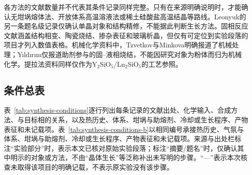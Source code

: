 各方法的文献数量并不代表其条件记录同样完整。只有在来源明确说明时，才能确认无坩埚熔体法、开放体系高温溶液法或稀土硅酸盐高温结晶等路线\cite{christensen1994investigation,ababaikeri2024ba3zn4si4o15,leonyuk1999high,giess1982zn2sio4}。Leonyuk的另一条题名级记录仅确认单晶对象和结构精修，不能据此判断生长方法\cite{leonyuk1999crystal}。固相反应文献涵盖结构相变、陶瓷烧结、掺杂表征和玻璃析晶，但仅有可定位到实验段落的项目才列入数值表格\cite{lin1999phase,zou2021crystal,kerstan2012thermal,cai2024optimized,zhao2026crystal,tejas2024structural,pires2001luminescence,kerstan2015kristallphasen}。机械化学资料中，Tzvetkov与Minkova明确报道了机械处理；Yıldırım仅报道助剂参与的固--液相烧结，不能因研究对象为粉体而归为机械化学\cite{tzvetkov2001effects,yldrm2009y2sio5}。提拉法资料同样仅作为Y$_2$SiO$_5$\slash Ln$_2$SiO$_5$的工艺参照\cite{pang2005study,alizadeh2021spectroscopy,shoudu1999czochralski,brandle1986czochralski}。

\subsection{条件总表}

表~\ref{tab:synthesis-conditions}\CJKecglue{}逐行列出每条记录的文献出处、化学输入、合成方法、与目标相的关系，以及热历史、体系、坩埚与助熔剂、冷却或生长程序、产物表征和未记载项。表~\ref{tab:synthesis-conditions-b}\CJKecglue{}以相同编号承接热历史、气氛与体系、坩埚与助熔剂、冷却或生长程序、产物表征和未记载项。来源与出处栏标注“实验部分”时，表示本文已核对原始实验段落；标注“摘要/题名”时，仅确认其中明示的对象或方法，不由“晶体生长”等泛称补出未写明的步骤。“—”表示本次核查未取得该项目的明确记载，不表示原实验没有该步骤。

